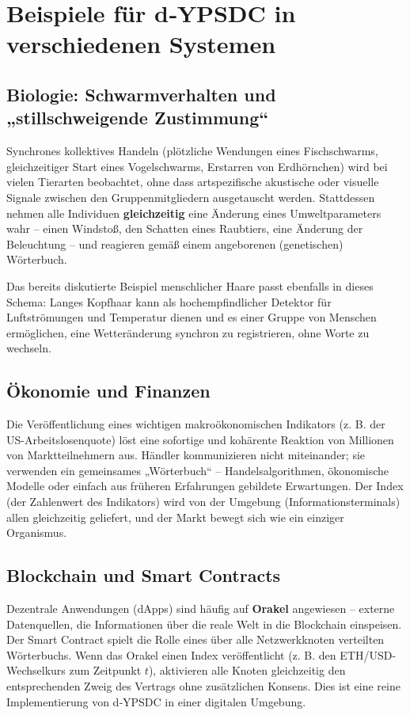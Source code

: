\documentclass[12pt,a4paper]{article}
\begin{document}
	\section{Beispiele für d‑YPSDC in verschiedenen Systemen}
	
	\subsection{Biologie: Schwarmverhalten und „stillschweigende Zustimmung“}
	
	Synchrones kollektives Handeln (plötzliche Wendungen eines Fischschwarms, gleichzeitiger Start eines Vogelschwarms, Erstarren von Erdhörnchen) wird bei vielen Tierarten beobachtet, ohne dass artspezifische akustische oder visuelle Signale zwischen den Gruppenmitgliedern ausgetauscht werden. Stattdessen nehmen alle Individuen \textbf{gleichzeitig} eine Änderung eines Umweltparameters wahr – einen Windstoß, den Schatten eines Raubtiers, eine Änderung der Beleuchtung – und reagieren gemäß einem angeborenen (genetischen) Wörterbuch.
	
	Das bereits diskutierte Beispiel menschlicher Haare passt ebenfalls in dieses Schema: Langes Kopfhaar kann als hochempfindlicher Detektor für Luftströmungen und Temperatur dienen und es einer Gruppe von Menschen ermöglichen, eine Wetteränderung synchron zu registrieren, ohne Worte zu wechseln.
	
	\subsection{Ökonomie und Finanzen}
	
	Die Veröffentlichung eines wichtigen makroökonomischen Indikators (z. B. der US-Arbeitslosenquote) löst eine sofortige und kohärente Reaktion von Millionen von Marktteilnehmern aus. Händler kommunizieren nicht miteinander; sie verwenden ein gemeinsames „Wörterbuch“ – Handelsalgorithmen, ökonomische Modelle oder einfach aus früheren Erfahrungen gebildete Erwartungen. Der Index (der Zahlenwert des Indikators) wird von der Umgebung (Informationsterminals) allen gleichzeitig geliefert, und der Markt bewegt sich wie ein einziger Organismus.
	
	\subsection{Blockchain und Smart Contracts}
	
	Dezentrale Anwendungen (dApps) sind häufig auf \textbf{Orakel} angewiesen – externe Datenquellen, die Informationen über die reale Welt in die Blockchain einspeisen. Der Smart Contract spielt die Rolle eines über alle Netzwerkknoten verteilten Wörterbuchs. Wenn das Orakel einen Index veröffentlicht (z. B. den ETH/USD-Wechselkurs zum Zeitpunkt \(t\)), aktivieren alle Knoten gleichzeitig den entsprechenden Zweig des Vertrags ohne zusätzlichen Konsens. Dies ist eine reine Implementierung von d‑YPSDC in einer digitalen Umgebung.
	
\end{document}
